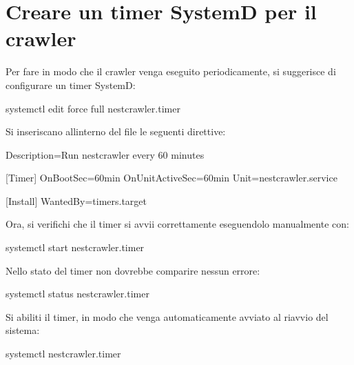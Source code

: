 \documentclass[letterpaper,10pt,italian]{sphinxmanual}
\begin{document}
\section{Creare un timer SystemD per il crawler}
\label{\detokenize{guide/installation:creare-un-timer-systemd-per-il-crawler}}
\sphinxAtStartPar
Per fare in modo che il crawler venga eseguito periodicamente, si suggerisce di configurare un timer SystemD:

\begin{sphinxVerbatim}[commandchars=\\\{\}]
systemctl edit \PYGZhy{}\PYGZhy{}force \PYGZhy{}\PYGZhy{}full nest\PYGZhy{}crawler.timer
\end{sphinxVerbatim}

\sphinxAtStartPar
Si inseriscano all\textquotesingle{}interno del file le seguenti direttive:

\begin{sphinxVerbatim}[commandchars=\\\{\}]
[Unit]
Description=Run nest\PYGZhy{}crawler every 60 minutes

[Timer]
OnBootSec=60min
OnUnitActiveSec=60min
Unit=nest\PYGZhy{}crawler.service

[Install]
WantedBy=timers.target
\end{sphinxVerbatim}

\sphinxAtStartPar
Ora, si verifichi che il timer si avvii correttamente eseguendolo manualmente con:

\begin{sphinxVerbatim}[commandchars=\\\{\}]
systemctl start nest\PYGZhy{}crawler.timer
\end{sphinxVerbatim}

\sphinxAtStartPar
Nello stato del timer non dovrebbe comparire nessun errore:

\begin{sphinxVerbatim}[commandchars=\\\{\}]
systemctl status nest\PYGZhy{}crawler.timer
\end{sphinxVerbatim}

\sphinxAtStartPar
Si abiliti il timer, in modo che venga automaticamente avviato al riavvio del sistema:

\begin{sphinxVerbatim}[commandchars=\\\{\}]
systemctl  nest\PYGZhy{}crawler.timer
\end{sphinxVerbatim}
\end{document}
